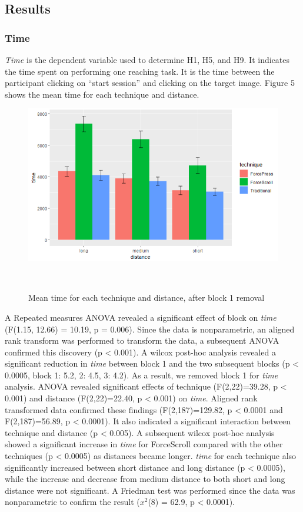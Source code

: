 \documentclass{sigchi}
\begin{document}
\subsection{Results}
\subsubsection{Time}
\textit{Time} is the dependent variable used to determine H1, H5, and H9. It indicates the time spent on performing one reaching task. It is the time between the participant clicking on ``start session'' and clicking on the target image. Figure 5 shows the mean time for each technique and distance.
\begin{figure}[!h]
	\centering
	\includegraphics[width=0.8\columnwidth]{figures/figure4}
	\caption{Mean time for each technique and distance, after block 1 removal}~\label{fig:figure5}
\end{figure}
 
A Repeated measures ANOVA revealed a significant effect of block on \textit{time} (F(1.15, 12.66) = 10.19, p = 0.006). Since the data is nonparametric, an aligned rank transform was performed to transform the data, a subsequent ANOVA confirmed this discovery (p < 0.001). A wilcox post-hoc analysis revealed a significant reduction in \textit{time} between block 1 and the two subsequent blocks (p < 0.0005, block 1: 5.2, 2: 4.5, 3: 4.2). As a result, we removed block 1 for \textit{time} analysis. ANOVA revealed significant effects of technique (F(2,22)=39.28, p < 0.001) and distance (F(2,22)=22.40, p < 0.001) on \textit{time}. Aligned rank transformed data confirmed these findings (F(2,187)=129.82, p < 0.0001 and F(2,187)=56.89, p < 0.0001). It also indicated a significant interaction between technique and distance (p < 0.005). A subsequent wilcox post-hoc analysis showed a significant increase in \textit{time} for ForceScroll compared with the other techniques (p < 0.0005) as distances became longer. \textit{time} for each technique also significantly increased between short distance and long distance (p < 0.0005), while the increase and decrease from medium distance to both short and long distance were not significant. A Friedman test was performed since the data was nonparametric to confirm the result ($x^{2}$(8) = 62.9, p < 0.0001).
\end{document}
